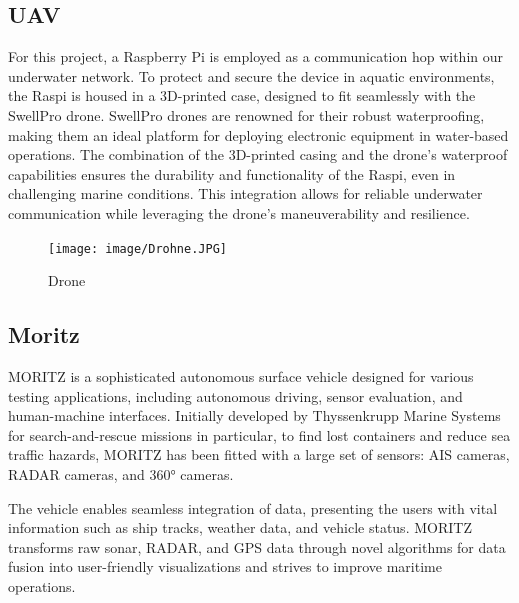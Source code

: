 \documentclass[]{nsm-thesis}
\begin{document}
\subsection{UAV}

For this project, a Raspberry Pi is employed  as a communication hop within our underwater network. To protect and secure the device in aquatic environments, the Raspi is housed in a 3D-printed case, designed to fit seamlessly with the SwellPro drone. SwellPro drones are renowned for their robust waterproofing, making them an ideal platform for deploying electronic equipment in water-based operations. The combination of the 3D-printed casing and the drone's waterproof capabilities ensures the durability and functionality of the Raspi, even in challenging marine conditions. This integration allows for reliable underwater communication while leveraging the drone's maneuverability and resilience.
\begin{figure}[h!]
    \centering
    \texttt{[image: image/Drohne.JPG]}
    \caption{Drone}
    \label{fig:example}
\end{figure}

\subsection{Moritz}
MORITZ is a sophisticated autonomous surface vehicle designed for various testing applications, including autonomous driving, sensor evaluation, and human-machine interfaces. Initially developed by Thyssenkrupp Marine Systems for search-and-rescue missions in particular, to find lost containers and reduce sea traffic hazards, MORITZ has been fitted with a large set of sensors: AIS cameras, RADAR cameras, and 360° cameras.

The vehicle enables seamless integration of data, presenting the users with vital information such as ship tracks, weather data, and vehicle status. MORITZ transforms raw sonar, RADAR, and GPS data through novel algorithms for data fusion into user-friendly visualizations and strives to improve maritime operations.
\end{document}
